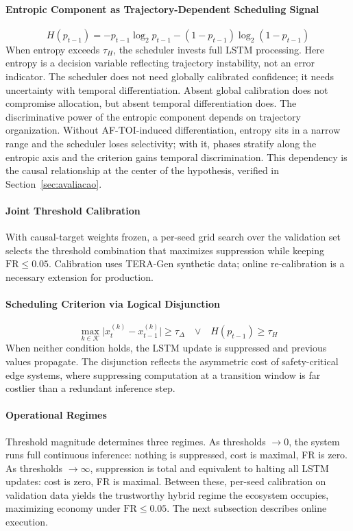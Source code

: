 \documentclass[a4paper,fleqn]{cas-dc}
\newcommand{\TERAGen}{\mbox{TERA-Gen}\xspace}
\newcommand{\AFTOI}{\mbox{AF-TOI}\xspace}
\begin{document}
\paragraph{Entropic Component as Trajectory-Dependent Scheduling Signal}
\begin{equation}
H(p_{t-1}) = -p_{t-1}\log_2 p_{t-1} - (1 - p_{t-1})\log_2(1 - p_{t-1})
\label{eq:entropia}
\end{equation}
When entropy exceeds $\tau_H$, the scheduler invests full LSTM processing. Here
entropy is a decision variable reflecting trajectory instability, not an error
indicator. The scheduler does not need globally calibrated confidence; it needs
uncertainty with temporal differentiation. Absent global calibration does not
compromise allocation, but absent temporal differentiation does.
The discriminative power of the entropic component depends on trajectory
organization. Without \AFTOI-induced differentiation, entropy sits in a narrow
range and the scheduler loses selectivity; with it, phases stratify along the
entropic axis and the criterion gains temporal discrimination. This dependency
is the causal relationship at the center of the hypothesis, verified in
Section~\ref{sec:avaliacao}.
\paragraph{Joint Threshold Calibration}
With causal-target weights frozen, a per-seed grid search over the validation
set selects the threshold combination that maximizes suppression while keeping
$\mathrm{FR} \le 0.05$. Calibration uses \TERAGen synthetic data; online
re-calibration is a necessary extension for production.
\paragraph{Scheduling Criterion via Logical Disjunction}
\begin{equation}
\max_{k \in \mathcal{K}} \bigl|x_t^{(k)} - x_{t-1}^{(k)}\bigr| \ge \tau_\Delta
\quad \boldsymbol{\lor} \quad H(p_{t-1}) \ge \tau_H
\label{eq:gating}
\end{equation}
When neither condition holds, the LSTM update is suppressed and previous values
propagate. The disjunction reflects the asymmetric cost of safety-critical edge
systems, where suppressing computation at a transition window is far costlier
than a redundant inference step.
\paragraph{Operational Regimes}
Threshold magnitude determines three regimes. As thresholds $\to 0$, the system
runs full continuous inference: nothing is suppressed, cost is maximal, FR is
zero. As thresholds $\to \infty$, suppression is total and equivalent to halting
all LSTM updates: cost is zero, FR is maximal. Between these, per-seed
calibration on validation data yields the trustworthy hybrid regime the
ecosystem occupies, maximizing economy under $\mathrm{FR}\le0.05$. The next
subsection describes online execution.
\end{document}
